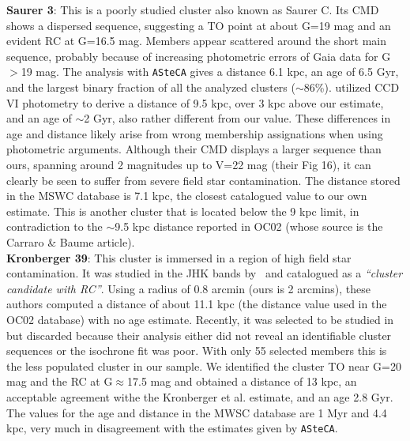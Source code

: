 \documentclass[draft]{aa}
\begin{document}
\begin{appendix}
  \noindent \textbf{Saurer 3}: This is a poorly studied cluster also known as Saurer C.
  Its CMD shows a dispersed sequence, suggesting a TO point at about G=19 mag
  and an evident RC at G=16.5 mag. Members appear scattered around the short
  main sequence, probably because of increasing photometric errors of Gaia data
  for G$>$19 mag.
  The analysis with \texttt{ASteCA} gives a distance 6.1 kpc, an age of 6.5
  Gyr, and the largest binary fraction of all the analyzed clusters 
  ($\sim$86\%).
  \cite{Carraro_2003} utilized CCD VI photometry to derive a distance of 9.5
  kpc, over 3 kpc above our estimate, and an age of $\sim$2 Gyr, also rather
  different from our value. These differences in age and distance likely
  arise from wrong membership assignations when using photometric
  arguments. Although their CMD displays a larger sequence than
  ours, spanning around 2 magnitudes up to V=22 mag (their Fig 16), it can
  clearly be seen to suffer from severe field star contamination.
  The distance stored in the MSWC database is 7.1 kpc, the closest catalogued
  value to our own estimate. This is another cluster that is located below the 9
  kpc limit, in contradiction to the $\sim$9.5 kpc distance reported in
  OC02 (whose source is the Carraro \& Baume article).\\

  \noindent \textbf{Kronberger 39}: This cluster is immersed in a region of high field
  star contamination. It was studied in the JHK bands by~\cite{Kronberger_2006}
  and catalogued as a \emph{``cluster candidate with RC''}. Using a radius of 0.8
  arcmin (ours is 2 arcmins), these authors computed a distance of about 11.1
  kpc (the distance value used in the OC02 database) with no age estimate.
  Recently, it was selected to be studied in~\cite{Monteiro_2020} but
  discarded because their analysis either did not reveal an identifiable cluster
  sequences or the isochrone fit was poor.
  With only 55 selected members this is the less populated cluster in our
  sample. We identified the cluster TO near G=20 mag and the RC at
  G$\approx$17.5 mag and obtained a distance of 13 kpc, an acceptable
  agreement withe the Kronberger et al. estimate, and an age 2.8 Gyr.
  The values for the age and distance in the MWSC database are 1 Myr and 4.4
  kpc, very much in disagreement with the estimates given by \texttt{ASteCA}.\\


\end{appendix}
\end{document}
